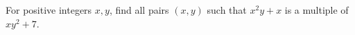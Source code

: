 For positive integers $x,y$, find all pairs $(x,y)$ such that $x^2y + x$ is a multiple of $xy^2 + 7$.